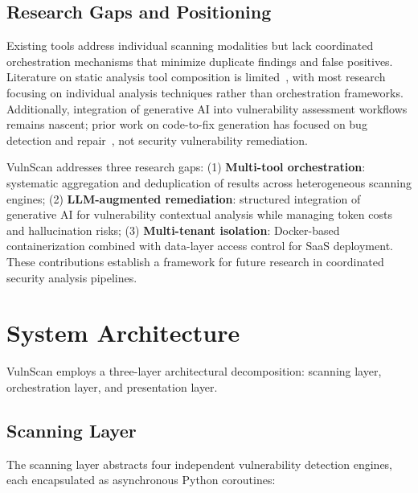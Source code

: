 \documentclass[10pt, conference, compsocconf]{IEEEtran}
\begin{document}
\subsection{Research Gaps and Positioning}

Existing tools address individual scanning modalities but lack coordinated orchestration mechanisms that minimize duplicate findings and false positives. Literature on static analysis tool composition is limited~\cite{nist2023}, with most research focusing on individual analysis techniques rather than orchestration frameworks. Additionally, integration of generative AI into vulnerability assessment workflows remains nascent; prior work on code-to-fix generation has focused on bug detection and repair~\cite{allamanis2018}, not security vulnerability remediation.

VulnScan addresses three research gaps: (1) \textbf{Multi-tool orchestration}: systematic aggregation and deduplication of results across heterogeneous scanning engines; (2) \textbf{LLM-augmented remediation}: structured integration of generative AI for vulnerability contextual analysis while managing token costs and hallucination risks; (3) \textbf{Multi-tenant isolation}: Docker-based containerization combined with data-layer access control for SaaS deployment. These contributions establish a framework for future research in coordinated security analysis pipelines.

\section{System Architecture}
\label{sec:architecture}

VulnScan employs a three-layer architectural decomposition: scanning layer, orchestration layer, and presentation layer.

\subsection{Scanning Layer}

The scanning layer abstracts four independent vulnerability detection engines, each encapsulated as asynchronous Python coroutines:
\end{document}
